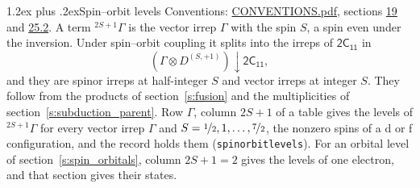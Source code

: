 \documentclass[10pt,a4paper]{article}
\makeatletter
\renewcommand\section{\@startsection{section}{1}{\z@}{-3ex plus -1ex minus -.2ex}%
  {1.2ex plus .2ex}{\normalfont\large\sffamily\bfseries\color{parttitle}}}
\numberwithin{equation}{section}
\newcommand{\grp}[1]{\mathsf{#1}}
\newcommand{\restr}[2]{#1\!\downarrow#2}
\newcommand{\irrJp}[2]{D^{(#1,#2)}}
\newcommand{\irrprod}{\otimes}
\newcommand{\term}[2]{{}^{#1}#2}
\makeatother
\begin{document}
\section{Spin--orbit levels}\label{s:spin_orbit}
Conventions: \href{../../CONVENTIONS.pdf}{CONVENTIONS.pdf}, sections \href{../../../rotation/CONVENTIONS.pdf\#conv.19}{19} and \href{../../CONVENTIONS.pdf\#conv.25.2}{25.2}.
\leavevmode\label{n:local.spin}\label{n:symbol.term}A term $\term{2S+1}{\Gamma}$ is the vector irrep $\Gamma$ with the spin $S$, a spin even under the inversion. Under spin--orbit coupling it splits into the irreps of $\grp{2C_{11}}$ in
\begin{equation}\label{e:spinorbit}\restr{(\Gamma \irrprod \irrJp{S}{+1})}{\grp{2C_{11}}},\end{equation}
and they are spinor irreps at half-integer $S$ and vector irreps at integer $S$. They follow from the products of section~\ref{s:fusion} and the multiplicities of section~\ref{s:subduction_parent}. Row $\Gamma$, column $2S + 1$ of a table gives the levels of $\term{2S+1}{\Gamma}$ for every vector irrep $\Gamma$ and $S = \nicefrac{1}{2}, 1, \dots, \nicefrac{7}{2}$, the nonzero spins of a d or f configuration, and the record holds them (\texttt{spinorbitlevels}). For an orbital level of section~\ref{s:spin_orbitals}, column $2S + 1 = 2$ gives the levels of one electron, and that section gives their states.
\end{document}
